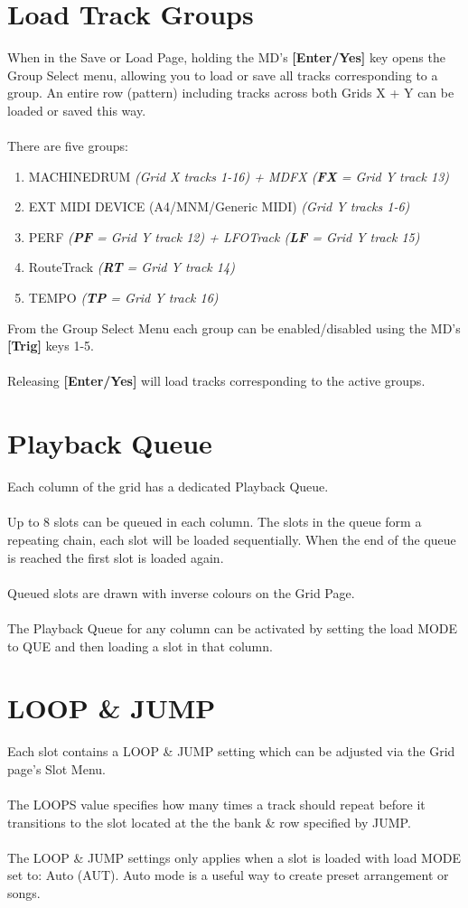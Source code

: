 \section{Load Track Groups}
When in the Save or Load Page, holding the MD's \textbf{[Enter/Yes]} key opens the Group Select menu, allowing you to load or save all tracks corresponding to a group. An entire row (pattern) including tracks across both Grids X + Y can be loaded or saved this way.\\\\
There are five groups:
\begin{enumerate}
    \item MACHINEDRUM \textit{(Grid X tracks 1-16) + MDFX (\textbf{FX} = Grid Y track 13)}
    \item EXT MIDI DEVICE (A4/MNM/Generic MIDI) \textit{(Grid Y tracks 1-6)}
    \item PERF \textit{(\textbf{PF} = Grid Y track 12) + LFOTrack (\textbf{LF }= Grid Y track 15) }
    \item  RouteTrack \textit{(\textbf{RT} = Grid Y track 14) }
    \item TEMPO \textit{(\textbf{TP} = Grid Y track 16)}
\end{enumerate}
From the Group Select Menu each group can be enabled/disabled using the MD's \textbf{[Trig]} keys 1-5. \\
\\
Releasing \textbf{[Enter/Yes]} will load tracks corresponding to the active groups.

\section{Playback Queue}
Each column of the grid has a dedicated Playback Queue.\\\\Up to 8 slots can be queued in each column.  The slots in the queue form a repeating chain, each slot will be loaded sequentially. When the end of the queue is reached the first slot is loaded again.\\\\Queued slots are drawn with inverse colours on the Grid Page.\\\\The Playback Queue for any column can be activated by setting the load MODE to QUE and then loading a slot in that column.

\section{LOOP \& JUMP}
Each slot contains a LOOP \& JUMP setting which can be adjusted via the Grid page's Slot Menu.\\\\The LOOPS value specifies how many times a track should repeat before it transitions to the slot located at the the bank \& row specified by JUMP.
\\\\The LOOP \& JUMP settings only applies when a slot is loaded with load MODE set to: Auto (AUT). Auto mode is a useful way to create preset arrangement or songs.


